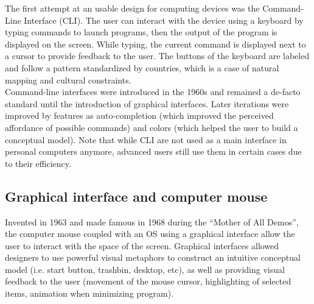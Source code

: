 \documentclass[a4paper,11pt] {article}
\theoremstyle{definition}
\begin{document}
    The first attempt at an usable design for computing devices was the Command-Line Interface (CLI). The user can interact with the device using a keyboard by typing commands to launch programs, then the output of the program is displayed on the screen. While typing, the current command is displayed next to a cursor to provide feedback to the user. The buttons of the keyboard are labeled and follow a pattern standardized by countries, which is a case of natural mapping and cultural constraints.\\

    Command-line interfaces were introduced in the 1960s and remained a de-facto standard until the introduction of graphical interfaces. Later iterations were improved by features as auto-completion (which improved the perceived affordance of possible commands) and colors (which helped the user to build a conceptual model). Note that while CLI are not used as a main interface in personal computers anymore, advanced users still use them in certain cases due to their efficiency.

    \subsection{Graphical interface and computer mouse}

    Invented in 1963 and made famous in 1968 during the ``Mother of All Demos''\cite{engelbart1968research}, the computer mouse coupled with an OS using a graphical interface allow the user to interact with the space of the screen. Graphical interfaces allowed designers to use powerful visual metaphors to construct an intuitive conceptual model (i.e. start button, trashbin, desktop, etc), as well as providing visual feedback to the user (movement of the mouse cursor, highlighting of selected items, animation when minimizing program).\\
\end{document}
